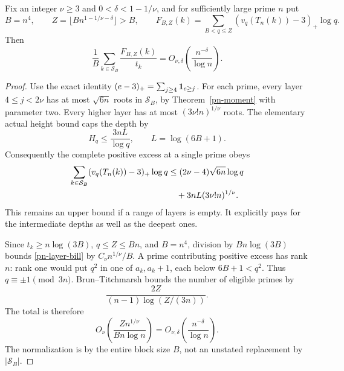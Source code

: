 \begin{theorem}
\label{pn-excess}
Fix an integer \(\nu\geq3\) and \(0<\delta<1-1/\nu\), and for
sufficiently large prime \(n\) put
\[
 B=n^4,\qquad Z=\lfloor Bn^{1-1/\nu-\delta}\rfloor>B,\qquad
 F_{B,Z}(k)=\sum_{B<q\leq Z}(v_q(T_n(k))-3)_+\log q.
\]
Then
\[
 \frac1B\sum_{k\in\mathcal{S}_B}\frac{F_{B,Z}(k)}{t_k}
       =O_{\nu,\delta}\!\left(\frac{n^{-\delta}}{\log n}\right).
\]
\end{theorem}
\begin{proof}
Use the exact identity
\((e-3)_+=\sum_{j\geq4}{\bf1}_{e\geq j}\).
For each prime, every layer \(4\leq j<2\nu\) has at most
\(\sqrt{6n}\) roots in \(\mathcal{S}_B\), by
Theorem~\ref{pn-moment} with parameter two. Every higher layer
has at most \((3\nu!n)^{1/\nu}\) roots.
The elementary actual height bound caps the depth by
\[
 H_q\leq\frac{3nL}{\log q},\qquad L=\log(6B+1).
\]
Consequently the complete positive excess at a single prime obeys
\begin{align}
 \sum_{k\in\mathcal{S}_B}(v_q(T_n(k))-3)_+\log q
 &\leq(2\nu-4)\sqrt{6n}\log q \notag\\
 &\quad+3nL(3\nu!n)^{1/\nu}. \label{pn-layer-bill}
\end{align}
This remains an upper bound if a range of layers is empty.
It explicitly pays for the intermediate depths as well as the
deepest ones.

Since \(t_k\geq n\log(3B)\), \(q\leq Z\leq Bn\), and \(B=n^4\),
division by \(Bn\log(3B)\) bounds \eqref{pn-layer-bill} by
\(C_\nu n^{1/\nu}/B\).
A prime contributing positive excess has rank \(n\): rank one
would put \(q^2\) in one of \(a_k,a_k+1\), each below
\(6B+1<q^2\). Thus \(q\equiv\pm1\pmod{3n}\).
Brun--Titchmarsh bounds the number of eligible primes by
\[
 \frac{2Z}{(n-1)\log(Z/(3n))}.
\]
The total is therefore
\[
 O_\nu\!\left(\frac{Zn^{1/\nu}}{Bn\log n}\right)
       =O_{\nu,\delta}\!\left(\frac{n^{-\delta}}{\log n}\right).
\]
The normalization is by the entire block size \(B\), not an
unstated replacement by \(|\mathcal{S}_B|\).
\end{proof}

